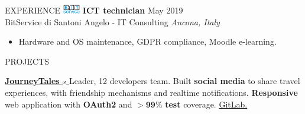 \documentclass{cv} %
\begin{document}
\begin{minipage}[b][0.9\paperheight][t]{0.7\linewidth}
\begin{rSection}{EXPERIENCE}
        \includegraphics[width=0.75cm, trim={0cm 1.5cm 0cm 0cm}]{bitservice-icon.png}
        \textbf{ICT technician} \hfill May 2019 \\
        \hspace*{0.85cm}BitService di Santoni Angelo - IT Consulting
        \hfill \textit{Ancona, Italy}
        \begin{itemize}
            \item Hardware and OS maintenance, GDPR compliance, Moodle e-learning.
        \end{itemize}
    \end{rSection}

    \begin{rSection}{PROJECTS}
        \item \textbf{\href{https://pufferfish.sa4.usi.ch/login}
            {
                JourneyTales
                \includegraphics[width=0.15cm, trim={10cm -10cm 0cm 0cm}]{ext-link-icon.png}
            }}
        {Leader, 12 developers team.
            Built \textbf{social media} to share travel experiences,
            with friendship mechanisms and realtime notifications.
            \textbf{Responsive} web application with \textbf{OAuth2} and $\boldsymbol{> 99\%}$ \textbf{test} coverage.
            \href{https://gitlab.com/usi-si-oss/teaching/projects-showcase/sa4/team-4-pufferfish}{GitLab.}
        }


\end{rSection}
\end{minipage}
\end{document}
